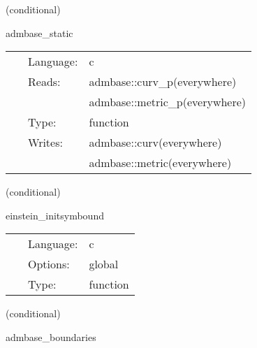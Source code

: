\vspace{5mm}

   (conditional) 

\hspace{5mm} admbase\_static 

\hspace{5mm}{\it copy the metric and extrinsic curvature to the current time level } 


\hspace{5mm}

 \begin{tabular*}{160mm}{cll} 
~ & Language:  & c \\ 
~ & Reads:  & admbase::curv\_p(everywhere) \\ 
~& ~ &admbase::metric\_p(everywhere)\\ 
~ & Type:  & function \\ 
~ & Writes:  & admbase::curv(everywhere) \\ 
~& ~ &admbase::metric(everywhere)\\ 
\end{tabular*} 


\vspace{5mm}

   (conditional) 

\hspace{5mm} einstein\_initsymbound 

\hspace{5mm}{\it set up gf symmetries } 


\hspace{5mm}

 \begin{tabular*}{160mm}{cll} 
~ & Language:  & c \\ 
~ & Options:  & global \\ 
~ & Type:  & function \\ 
\end{tabular*} 


\vspace{5mm}

   (conditional) 

\hspace{5mm} admbase\_boundaries 

\hspace{5mm}{\it select admbase boundary conditions - may be required for mesh refinement } 


\hspace{5mm}

